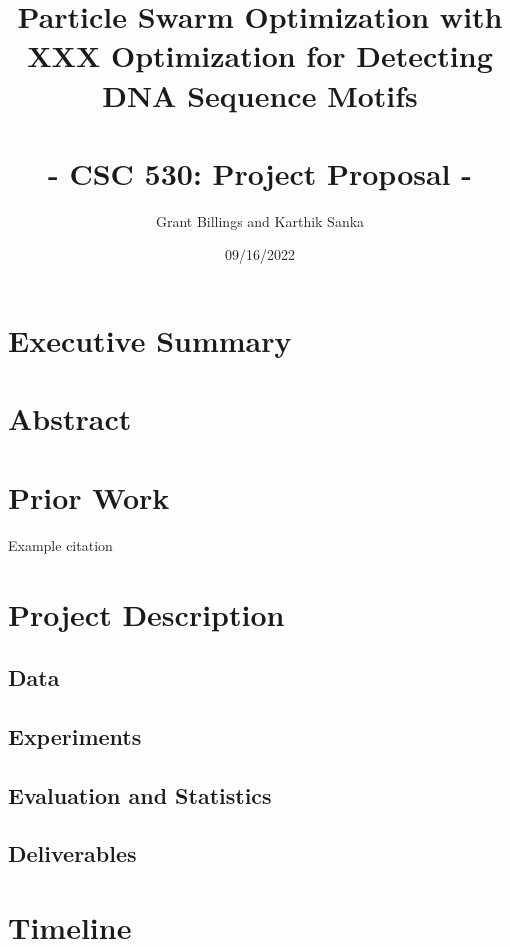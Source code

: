 \documentclass{article}
\title{%
	\Large Particle Swarm Optimization with XXX Optimization for Detecting DNA Sequence Motifs \\
	\large \; \\ - CSC 530: Project Proposal -}
\author{Grant Billings and Karthik Sanka}
\date{09/16/2022}
\begin{document}
\maketitle
\section{Executive Summary}
\section{Abstract}
\section{Prior Work}
Example citation \cite{fister2013brief}
\section{Project Description}
\subsection{Data}
\subsection{Experiments}
\subsection{Evaluation and Statistics}
\subsection{Deliverables}
\section{Timeline}
\printbibliography
\end{document}
